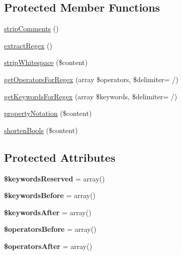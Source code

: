 \subsection*{Protected Member Functions}
\begin{DoxyCompactItemize}
\item 
\hyperlink{classMatthiasMullie_1_1Minify_1_1JS_ac3943c7955686b4663841127d34904aa}{strip\+Comments} ()
\item 
\hyperlink{classMatthiasMullie_1_1Minify_1_1JS_a7b378520a52fc1c481e1203db2b2690b}{extract\+Regex} ()
\item 
\hyperlink{classMatthiasMullie_1_1Minify_1_1JS_a606de6739e8cc8dc2c89fadfb8d88441}{strip\+Whitespace} (\$content)
\item 
\hyperlink{classMatthiasMullie_1_1Minify_1_1JS_a67ba0e7a20f68d37b6bfa70f6acd4c8e}{get\+Operators\+For\+Regex} (array \$operators, \$delimiter= \textquotesingle{}/\textquotesingle{})
\item 
\hyperlink{classMatthiasMullie_1_1Minify_1_1JS_a211df554a13d9f15ee1c9749db14682e}{get\+Keywords\+For\+Regex} (array \$keywords, \$delimiter= \textquotesingle{}/\textquotesingle{})
\item 
\hyperlink{classMatthiasMullie_1_1Minify_1_1JS_a5aeb1417da79b7ee06fee143453636ca}{property\+Notation} (\$content)
\item 
\hyperlink{classMatthiasMullie_1_1Minify_1_1JS_a13bc3c81a77551065269f96f24c602b7}{shorten\+Bools} (\$content)
\end{DoxyCompactItemize}
\subsection*{Protected Attributes}
\begin{DoxyCompactItemize}
\item 
{\bfseries \$keywords\+Reserved} = array()\hypertarget{classMatthiasMullie_1_1Minify_1_1JS_a13841992e9ce5ce8b4eea39bd1c50ee8}{}\label{classMatthiasMullie_1_1Minify_1_1JS_a13841992e9ce5ce8b4eea39bd1c50ee8}

\item 
{\bfseries \$keywords\+Before} = array()\hypertarget{classMatthiasMullie_1_1Minify_1_1JS_a49cf0a93be6f10af163695abe4dfbbc5}{}\label{classMatthiasMullie_1_1Minify_1_1JS_a49cf0a93be6f10af163695abe4dfbbc5}

\item 
{\bfseries \$keywords\+After} = array()\hypertarget{classMatthiasMullie_1_1Minify_1_1JS_a0149c6be13a7f1ef504b58453e248a0e}{}\label{classMatthiasMullie_1_1Minify_1_1JS_a0149c6be13a7f1ef504b58453e248a0e}

\item 
{\bfseries \$operators\+Before} = array()\hypertarget{classMatthiasMullie_1_1Minify_1_1JS_ac42c95ffbd08ad279e01aa50af6825a6}{}\label{classMatthiasMullie_1_1Minify_1_1JS_ac42c95ffbd08ad279e01aa50af6825a6}

\item 
{\bfseries \$operators\+After} = array()\hypertarget{classMatthiasMullie_1_1Minify_1_1JS_a42ce174a7220b6e1bdaf9a618531d9d5}{}\label{classMatthiasMullie_1_1Minify_1_1JS_a42ce174a7220b6e1bdaf9a618531d9d5}

\end{DoxyCompactItemize}


